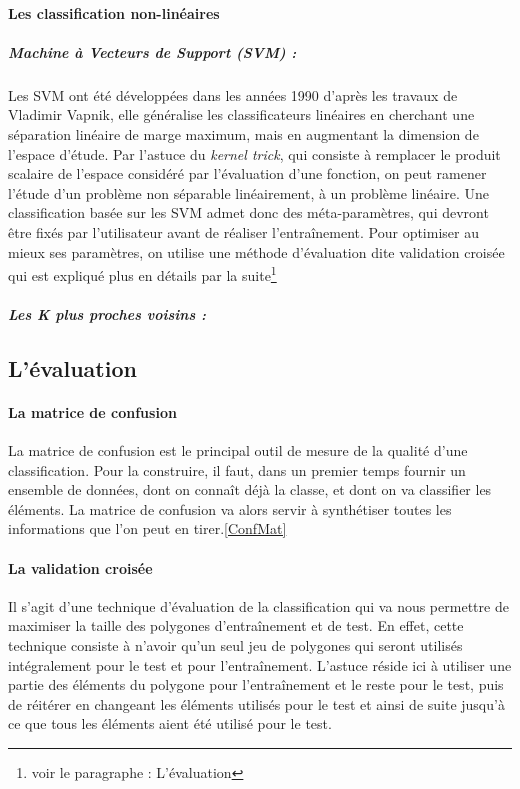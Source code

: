 \documentclass[a4paper,10pt]{report}
\begin{document}
\begin{multicols}{2}
\paragraph{Les classification non-linéaires}
\subparagraph{Machine à Vecteurs de Support (SVM) :}

Les SVM ont été développées dans les années 1990 d'après les travaux de Vladimir Vapnik, elle généralise les classificateurs linéaires en cherchant une séparation linéaire de marge maximum, mais en augmentant la dimension de l'espace d'étude. Par l'astuce du \textit{kernel trick}\cite{aizermanSVM}, qui consiste à remplacer le produit scalaire de l'espace considéré par l'évaluation d'une fonction, on peut ramener l'étude d'un problème non séparable linéairement, à un problème linéaire. Une classification basée sur les SVM admet donc des méta-paramètres, qui devront être fixés par l'utilisateur avant de réaliser l'entraînement. Pour optimiser au mieux ses paramètres, on utilise une méthode d'évaluation dite validation croisée qui est expliqué plus en détails par la suite\footnote{voir le paragraphe : L'évaluation}
\subparagraph{Les K plus proches voisins :}
\subsection{L'évaluation}
\paragraph{La matrice de confusion\newline}
La matrice de confusion est le principal outil de mesure de la qualité d'une classification. Pour la construire, il faut, dans un premier temps fournir un ensemble de données, dont on connaît déjà la classe, et dont on va classifier les éléments. La matrice de confusion va alors servir à synthétiser toutes les informations que l'on peut en tirer.\ref{ConfMat}

\newpage
\paragraph{La validation croisée\newline}
Il s'agit d'une technique d'évaluation de la classification qui va nous permettre de maximiser la taille des polygones d'entraînement et de test. En effet, cette technique consiste à n'avoir qu'un seul jeu de polygones qui seront utilisés intégralement pour le test et pour l'entraînement. L'astuce réside ici à utiliser une partie des éléments du polygone pour l'entraînement et le reste pour le test, puis de réitérer en changeant les éléments utilisés pour le test et ainsi de suite jusqu'à ce que tous les éléments aient été utilisé pour le test.


\end{multicols}
\end{document}

